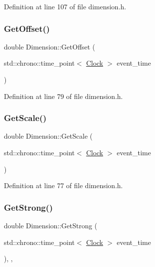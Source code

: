 Definition at line 107 of file dimension.\+h.

\mbox{\label{class_dimension_a58009cd435ead4b7b2f395a11fda0ae8}} 
\subsubsection{\texorpdfstring{Get\+Offset()}{GetOffset()}}
{\footnotesize\ttfamily double Dimension\+::\+Get\+Offset (\begin{DoxyParamCaption}\item[{std\+::chrono\+::time\+\_\+point$<$ \mbox{\hyperlink{universe_8h_a0ef8d951d1ca5ab3cfaf7ab4c7a6fd80}{Clock}} $>$}]{event\+\_\+time }\end{DoxyParamCaption})\hspace{0.3cm}{\ttfamily [inline]}}



Definition at line 79 of file dimension.\+h.

\mbox{\label{class_dimension_a6985e3d8738202530cb2cd428b5b884c}} 
\subsubsection{\texorpdfstring{Get\+Scale()}{GetScale()}}
{\footnotesize\ttfamily double Dimension\+::\+Get\+Scale (\begin{DoxyParamCaption}\item[{std\+::chrono\+::time\+\_\+point$<$ \mbox{\hyperlink{universe_8h_a0ef8d951d1ca5ab3cfaf7ab4c7a6fd80}{Clock}} $>$}]{event\+\_\+time }\end{DoxyParamCaption})\hspace{0.3cm}{\ttfamily [inline]}}



Definition at line 77 of file dimension.\+h.

\mbox{\label{class_dimension_ae36aadad4ae84735a5ff73bff4eb97b1}} 
\subsubsection{\texorpdfstring{Get\+Strong()}{GetStrong()}}
{\footnotesize\ttfamily double Dimension\+::\+Get\+Strong (\begin{DoxyParamCaption}\item[{std\+::chrono\+::time\+\_\+point$<$ \mbox{\hyperlink{universe_8h_a0ef8d951d1ca5ab3cfaf7ab4c7a6fd80}{Clock}} $>$}]{event\+\_\+time }\end{DoxyParamCaption})\hspace{0.3cm}{\ttfamily [inline]}, {\ttfamily [final]}, {\ttfamily [virtual]}}



